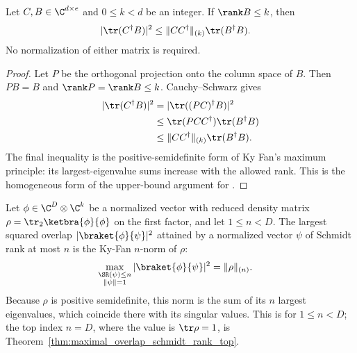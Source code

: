 \begin{lemma}
    \label{lem:homogeneous_overlap_ky_fan}
    Let $C,B\in\C^{d\times e}$ and $0\le k<d$ be an integer.
    If $\rank B\le k$, then
    \begin{align}
        |\tr(C^\dagger B)|^2
         & \le \|CC^\dagger\|_{(k)}\tr(B^\dagger B).
        \notag
    \end{align}
    No normalization of either matrix is required.
\end{lemma}
\begin{proof}
    Let $P$ be the orthogonal projection onto the column space of $B$.
    Then $PB=B$ and $\rank P=\rank B\le k$. Cauchy--Schwarz gives
    \begin{align}
        |\tr(C^\dagger B)|^2
         & =|\tr((PC)^\dagger B)|^2                 \\
         & \le\tr(PCC^\dagger)\tr(B^\dagger B)      \\
         & \le\|CC^\dagger\|_{(k)}\tr(B^\dagger B).
        \notag
    \end{align}
    The final inequality is the positive-semidefinite form of Ky Fan's
    maximum principle: its largest-eigenvalue sums increase with the allowed
    rank. This is the homogeneous form of the upper-bound argument for
    \cite[Lemma~3.1]{Wolf2012Quantum}.
\end{proof}

\begin{theorem}
    \label{thm:maximal_overlap_schmidt_rank}
    \leanok
    Let $\phi\in\C^{D}\otimes\C^k$ be a normalized vector with reduced density
    matrix $\rho=\tr_2\ketbra{\phi}{\phi}$ on the first factor, and let
    $1\le n<D$. The largest squared overlap $|\braket{\phi}{\psi}|^2$ attained
    by a normalized vector $\psi$ of Schmidt rank at most $n$ is the Ky-Fan
    $n$-norm of $\rho$:
    \begin{align}
        \max_{\substack{\SR(\psi)\le n \\ \|\psi\|=1}}
        |\braket{\phi}{\psi}|^2
         & =\|\rho\|_{(n)}.
        \label{eq:schwarz_maximal_schmidt_overlap}
    \end{align}
    Because $\rho$ is positive semidefinite, this norm is the sum of its $n$
    largest eigenvalues, which coincide there with its singular values. This is
    \cite[Lemma~3.1]{Wolf2012Quantum} for $1\le n<D$; the top index $n=D$,
    where the value is $\tr\rho=1$, is
    Theorem~\ref{thm:maximal_overlap_schmidt_rank_top}.
\end{theorem}

